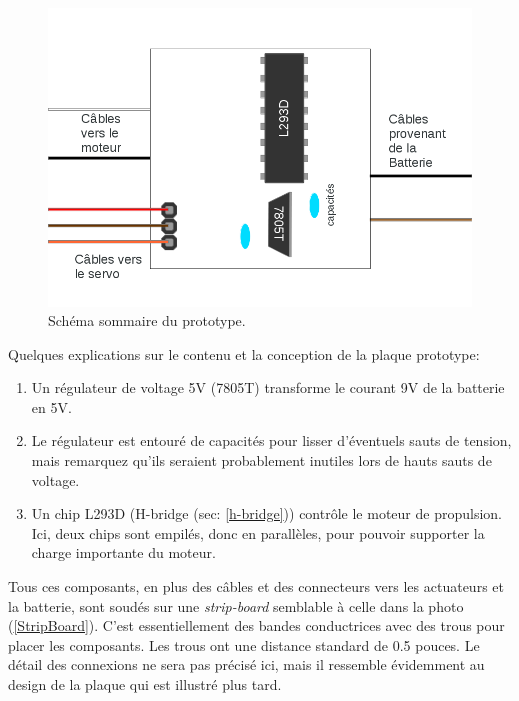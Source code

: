 \documentclass[a4paper,11pt]{report}
\begin{document}
{\begin{figure}[h]
\centering
\includegraphics[width=1.0\textwidth]{figures/SchemaPlaqueMaison}
    \caption{\label{SchemaPlaqueMaison}Schéma sommaire du prototype.
    }
\end{figure}

Quelques explications sur le contenu et la conception de la plaque prototype:

\begin{enumerate}
	\item Un régulateur de voltage 5V (7805T) transforme le courant 9V de
          la batterie en 5V. 

	\item Le régulateur est entouré de capacités pour lisser d'éventuels
          sauts de tension, mais remarquez qu'ils seraient probablement
          inutiles lors de hauts sauts de voltage. 

	\item Un chip L293D (H-bridge (sec: \ref{h-bridge})) contrôle le
          moteur de propulsion. Ici, deux chips sont empilés, donc en
          parallèles, pour pouvoir supporter la charge importante du moteur. 
\end{enumerate}

Tous ces composants, en plus des câbles et des connecteurs vers les actuateurs
et la batterie, sont soudés sur une \textit{strip-board} semblable à celle dans
la photo (\ref{StripBoard}). C'est essentiellement des bandes conductrices avec des trous pour placer les
composants. Les trous ont une distance standard de 0.5 pouces. Le détail des
connexions ne sera pas précisé ici, mais il ressemble évidemment 
au design de la plaque qui est illustré plus tard.   

}
\end{document}
